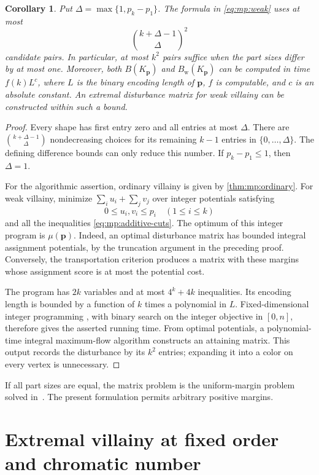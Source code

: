 \documentclass[10pt,a4paper]{amsart}
\numberwithin{equation}{section}
\newtheorem{corollary}[theorem]{Corollary}
\theoremstyle{definition}
\theoremstyle{remark}
\begin{document}
\begin{corollary}\label{cor:mp:computation}
Put $\Delta=\max\{1,p_k-p_1\}$. The formula in
\eqref{eq:mp:weak} uses at most
\[
 \binom{k+\Delta-1}{\Delta}^{\!2}
\]
candidate pairs. In particular, at most $k^2$ pairs suffice when the
part sizes differ by at most one.
Moreover, both $B(K_{\mathbf p})$ and $B_{\mathrm w}(K_{\mathbf p})$
can be computed in time $f(k)L^c$, where $L$ is the binary encoding
length of $\mathbf p$, $f$ is computable, and $c$ is an absolute constant.
An extremal disturbance matrix for weak villainy can be constructed
within such a bound.
\end{corollary}
\begin{proof}
Every shape has first entry zero and all entries at most $\Delta$.
There are $\binom{k+\Delta-1}{\Delta}$ nondecreasing choices for its
remaining $k-1$ entries in $\{0,\ldots,\Delta\}$. The defining
difference bounds can only reduce this number. If $p_k-p_1\le1$,
then $\Delta=1$.

For the algorithmic assertion, ordinary villainy is given by
\cref{thm:mp:ordinary}. For weak villainy, minimize
$\sum_i u_i+\sum_jv_j$ over integer potentials satisfying
\[
 0\le u_i,v_i\le p_i\quad(1\le i\le k)
\]
and all the inequalities \eqref{eq:mp:additive-cuts}.
The optimum of this integer program is $\mu(\mathbf p)$.
Indeed, an optimal disturbance matrix has bounded integral assignment
potentials, by the truncation argument in the preceding proof.
Conversely, the transportation criterion produces a matrix with these
margins whose assignment score is at most the potential cost.

The program has $2k$ variables and at most $4^k+4k$ inequalities.
Its encoding length is bounded by a function of $k$ times a polynomial
in $L$. Fixed-dimensional integer programming
\cite{lenstra1983,kannan1983}, with binary search on the integer
objective in $[0,n]$, therefore gives the asserted running time.
From optimal potentials, a polynomial-time integral maximum-flow
algorithm constructs an attaining matrix. This output records the
disturbance by its $k^2$ entries; expanding it into a color on every
vertex is unnecessary.
\end{proof}

If all part sizes are equal, the matrix problem is the uniform-margin
problem solved in~\cite{dinitz2012,gajula2015}. The present formulation
permits arbitrary positive margins.

\section{Extremal villainy at fixed order and chromatic number}
\label{sec:extremal}
\end{document}
